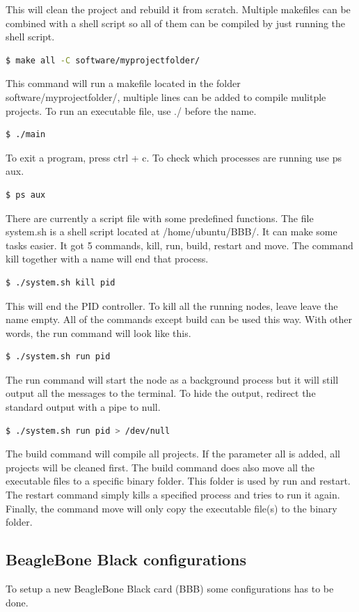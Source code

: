 \noindent This will clean the project and rebuild it from scratch. Multiple makefiles can be combined with a shell script so all of them can be compiled by just running the shell script. 
\begin{lstlisting}[language=bash]
  $ make all -C software/myprojectfolder/
\end{lstlisting}
\noindent This command will run a makefile located in the folder software/myprojectfolder/, multiple lines can be added to compile mulitple projects. To run an executable file, use ./ before the name.
\begin{lstlisting}[language=bash]
  $ ./main
\end{lstlisting}
\noindent To exit a program, press ctrl + c. To check which processes are running use ps aux.
\begin{lstlisting}[language=bash]
  $ ps aux
\end{lstlisting}
\noindent There are currently a script file with some predefined functions. The file system.sh is a shell script located at /home/ubuntu/BBB/. It can make some tasks easier. It got 5 commands, kill, run, build, restart and move. The command kill together with a name will end that process.
\begin{lstlisting}[language=bash]
  $ ./system.sh kill pid
\end{lstlisting}
\noindent This will end the PID controller. To kill all the running nodes, leave leave the name empty. All of the commands except build can be used this way. With other words, the run command will look like this.
\begin{lstlisting}[language=bash]
  $ ./system.sh run pid
\end{lstlisting}
\noindent The run command will start the node as a background process but it will still output all the messages to the terminal. To hide the output, redirect the standard output with a pipe to null.
\begin{lstlisting}[language=bash]
  $ ./system.sh run pid > /dev/null
\end{lstlisting}
\noindent The build command will compile all projects. If the parameter all is added, all projects will be cleaned first. The build command does also move all the executable files to a specific binary folder. This folder is used by run and restart. The restart command simply kills a specified process and tries to run it again. Finally, the command move will only copy the executable file(s) to the binary folder.

\subsection{BeagleBone Black configurations}
To setup a new BeagleBone Black card (BBB) some configurations has to be done.

